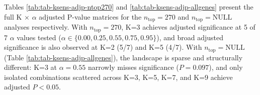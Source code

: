 \documentclass[
]{article}
\begin{document}
\begin{table}[!h]
\centering
\caption{\label{tab:tab-ksens-summary}Three-way comparison of K-sensitivity analyses differing only in gene-projection setting ($n_{\text{top}}$) and regularization ($\lambda$, $\xi$). All analyses span K $\in$ \{2, 3, 5, 7, 9\} $\times$ $\alpha \in$ \{0, 0.25, 0.35, 0.55, 0.75, 0.85, 0.95\} = 35 combinations. Count shows combinations achieving adjusted $P < 0.05$; bold highlights the $n_{\text{top}}=270$ result that restores K=3 adjusted significance.}
\centering
{}
\end{table}

Tables \ref{tab:tab-ksens-adjp-ntop270} and
\ref{tab:tab-ksens-adjp-allgenes} present the full K \(\times\)
\(\alpha\) adjusted P-value matrices for the \(n_{\text{top}} = 270\)
and \(n_{\text{top}} = \text{NULL}\) analyses respectively. With
\(n_{\text{top}} = 270\), K=3 achieves adjusted significance at 5 of 7
\(\alpha\) values tested
(\(\alpha \in \{0.00, 0.25, 0.55, 0.75, 0.95\}\)), and broad adjusted
significance is also observed at K=2 (5/7) and K=5 (4/7). With
\(n_{\text{top}} = \text{NULL}\) (Table
\ref{tab:tab-ksens-adjp-allgenes}), the landscape is sparse and
structurally different: K=3 at \(\alpha=0.55\) narrowly misses
significance (\(P = 0.097\)), and only isolated combinations scattered
across K=3, K=5, K=7, and K=9 achieve adjusted \(P < 0.05\).
\end{document}
